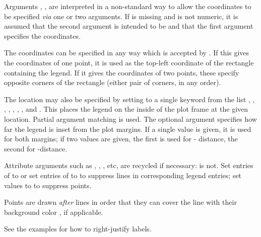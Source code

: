 %
\begin{Details}\relax
Arguments , ,  are interpreted in a
non-standard way to allow the coordinates to be specified \emph{via}
one or two arguments.  If  is missing and  is not
numeric, it is assumed that the second argument is intended to be
 and that the first argument specifies the coordinates.

The coordinates can be specified in any way which is accepted by
.  If this gives the coordinates of one point,
it is used as the top-left coordinate of the rectangle containing the
legend.  If it gives the coordinates of two points, these specify
opposite corners of the rectangle (either pair of corners, in any
order).

The location may also be specified by setting  to a single
keyword from the list , ,
, , ,
, ,  and
. This places the legend on the inside of the plot
frame at the given location. Partial argument matching is used.  The
optional  argument specifies how far the legend is inset
from the plot margins.  If a single value is given, it is used for
both margins; if two values are given, the first is used for -
distance, the second for -distance.

Attribute arguments such as , , , etc,
are recycled if necessary:  is not.  Set entries of
 to  or set entries of  to  to
suppress lines in corresponding legend entries; set 
values to  to suppress points.

Points are drawn \emph{after} lines in order that they can cover the
line with their background color , if applicable.

See the examples for how to right-justify labels.
\end{Details}
%
